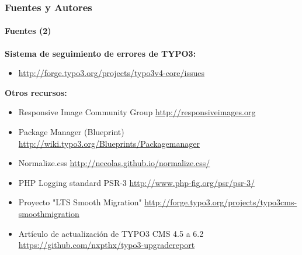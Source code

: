 
\begin{frame}[fragile]
	\frametitle{Fuentes y Autores}
	\framesubtitle{Fuentes (2)}

	\textbf{Sistema de seguimiento de errores de TYPO3:}
		\begin{itemize}\smaller
			\item \url{http://forge.typo3.org/projects/typo3v4-core/issues}
		\end{itemize}

	\textbf{Otros recursos:}
		\begin{itemize}\smaller

			\item Responsive Image Community Group\newline
				\url{http://responsiveimages.org}

			\item Package Manager (Blueprint)\newline
				\url{http://wiki.typo3.org/Blueprints/Packagemanager}

			\item Normalize.css\newline
				\url{http://necolas.github.io/normalize.css/}

			\item PHP Logging standard PSR-3\newline
				\url{http://www.php-fig.org/psr/psr-3/}

			\item Proyecto "LTS Smooth Migration"\newline
				\url{http://forge.typo3.org/projects/typo3cms-smoothmigration}

			\item Artículo de actualización de TYPO3 CMS 4.5 a 6.2
				\url{https://github.com/nxpthx/typo3-upgradereport}

		\end{itemize}

\end{frame}


